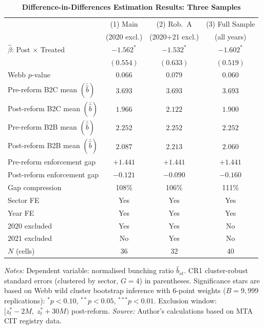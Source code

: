 \documentclass[12pt,oneside,a4paper]{report}
\begin{document}
\begin{table}[H]
\centering
\caption{\textbf{Difference-in-Differences Estimation Results: Three Samples}}
\label{tab:did}
\begin{threeparttable}
\begin{tabular}{lccc}
\toprule
 & (1) Main & (2) Rob.\ A & (3) Full Sample \\
 & (2020 excl.) & (2020+21 excl.) & (all years) \\
\midrule
$\hat{\beta}$: Post $\times$ Treated
  & $-1.562^{*}$ & $-1.532^{*}$ & $-1.602^{*}$ \\
  & $(0.554)$ & $(0.633)$ & $(0.519)$ \\
Webb $p$-value & 0.066 & 0.079 & 0.060 \\
\addlinespace
Pre-reform B2C mean $(\bar{\hat{b}})$ & $3.693$ & $3.693$ & $3.693$ \\
Post-reform B2C mean $(\bar{\hat{b}})$ & $1.966$ & $2.122$ & $1.900$ \\
Pre-reform B2B mean $(\bar{\hat{b}})$ & $2.252$ & $2.252$ & $2.252$ \\
Post-reform B2B mean $(\bar{\hat{b}})$ & $2.087$ & $2.213$ & $2.060$ \\
\addlinespace
Pre-reform enforcement gap & $+1.441$ & $+1.441$ & $+1.441$ \\
Post-reform enforcement gap & $-0.121$ & $-0.090$ & $-0.160$ \\
Gap compression & 108\% & 106\% & 111\% \\
\midrule
Sector FE     & Yes & Yes & Yes \\
Year FE       & Yes & Yes & Yes \\
2020 excluded & Yes & Yes & No  \\
2021 excluded & No  & Yes & No  \\
$N$ (cells)   & 36  & 32  & 40  \\
\bottomrule
\end{tabular}
\begin{tablenotes}\footnotesize
\item \textit{Notes:} Dependent variable: normalised bunching ratio $\hat{b}_{st}$. CR1 cluster-robust standard errors (clustered by sector, $G=4$) in parentheses. Significance stars are based on Webb wild cluster bootstrap inference \parencite{webb2023reworking} with 6-point weights ($B=9{,}999$ replications): $^{*}p<0.10$, $^{**}p<0.05$, $^{***}p<0.01$. Exclusion window: $[z^*_t-2M,\; z^*_t+30M)$ post-reform.
 \textit{Source:} Author's calculations based on MTA CIT registry data.
\end{tablenotes}
\end{threeparttable}
\end{table}
\end{document}
